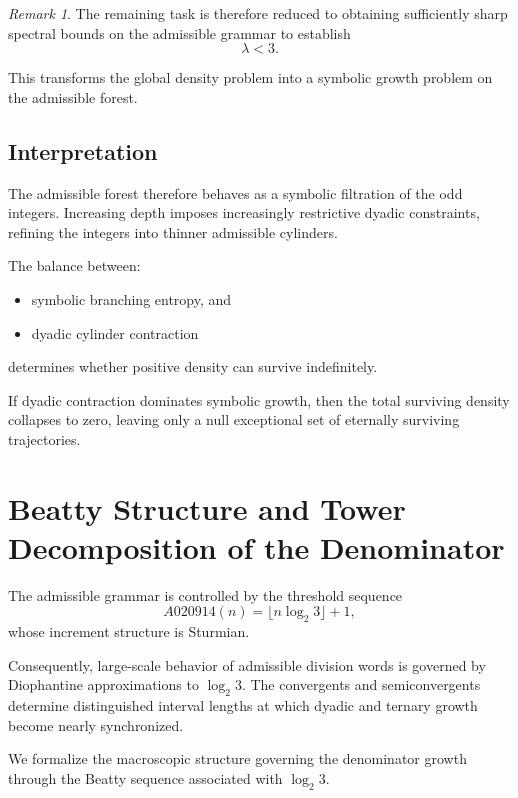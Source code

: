 \documentclass[12pt, oneside]{article}
\numberwithin{equation}{section}
\theoremstyle{definition}
\theoremstyle{plain}
\theoremstyle{remark}
\newtheorem*{remark}{Remark}
\begin{document}
\begin{remark}
The remaining task is therefore reduced to obtaining sufficiently sharp
spectral bounds on the admissible grammar to establish
\[
\lambda<3.
\]

This transforms the global density problem into a symbolic growth
problem on the admissible forest.
\end{remark}

\subsection{Interpretation}

The admissible forest therefore behaves as a symbolic filtration of the
odd integers. Increasing depth imposes increasingly restrictive dyadic
constraints, refining the integers into thinner admissible cylinders.

The balance between:
\begin{itemize}
\item symbolic branching entropy, and
\item dyadic cylinder contraction
\end{itemize}
determines whether positive density can survive indefinitely.

If dyadic contraction dominates symbolic growth, then the total
surviving density collapses to zero, leaving only a null exceptional
set of eternally surviving trajectories.

\section{Beatty Structure and Tower Decomposition of the Denominator}
\label{sec:beatty-towers}

The admissible grammar is controlled by the threshold sequence
\[
A020914(n)=\lfloor n\log_2 3\rfloor+1,
\]
whose increment structure is Sturmian.

Consequently, large-scale behavior of admissible division words is governed
by Diophantine approximations to \(\log_2 3\). The convergents and
semiconvergents determine distinguished interval lengths at which dyadic
and ternary growth become nearly synchronized.

We formalize the macroscopic structure governing the denominator growth
through the Beatty sequence associated with $\log_2 3$.
\end{document}
